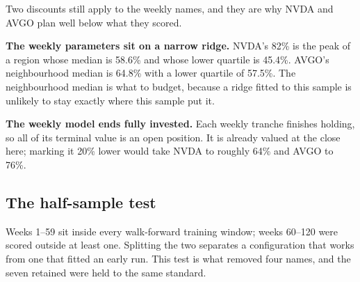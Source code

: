 \documentclass[11pt]{article}
\begin{document}
Two discounts still apply to the weekly names, and they are why NVDA and AVGO plan well below
what they scored.

\textbf{The weekly parameters sit on a narrow ridge.} NVDA's 82\% is the peak of a region whose
median is 58.6\% and whose lower quartile is 45.4\%. AVGO's neighbourhood median is 64.8\% with a
lower quartile of 57.5\%. The neighbourhood median is what to budget, because a ridge fitted to
this sample is unlikely to stay exactly where this sample put it.

\textbf{The weekly model ends fully invested.} Each weekly tranche finishes holding, so all of its
terminal value is an open position. It is already valued at the close here; marking it 20\% lower
would take NVDA to roughly 64\% and AVGO to 76\%.

\begin{center}\end{center}

\subsection{The half-sample test}

Weeks 1--59 sit inside every walk-forward training window; weeks 60--120 were scored outside at
least one. Splitting the two separates a configuration that works from one that fitted an early
run. This test is what removed four names, and the seven retained were held to the same standard.
\end{document}
